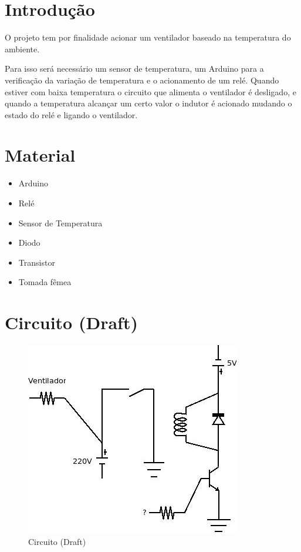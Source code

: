 \section{Introdução}\label{introduuxe7uxe3o}

O projeto \brz tem por finalidade acionar um ventilador baseado na
temperatura do ambiente.

Para isso será necessário um sensor de temperatura, um Arduino para a
verificação da variação de temperatura e o acionamento de um relé.
Quando estiver com baixa temperatura o circuito que alimenta o
ventilador é desligado, e quando a temperatura alcançar um certo valor o
indutor é acionado mudando o estado do relé e ligando o ventilador.

\section{Material}\label{material}

\begin{itemize}
\itemsep1pt\parskip0pt
\item
  Arduino
\item
  Relé
\item
  Sensor de Temperatura
\item
  Diodo
\item
  Transistor
\item
  Tomada fêmea
\end{itemize}

\section{Circuito (Draft)}\label{circuito-draft}

\begin{figure}[h]
    \includegraphics[scale=0.7]{img/breeze-diagram-1.jpg}
    \caption{Circuito (Draft)}
\end{figure}
